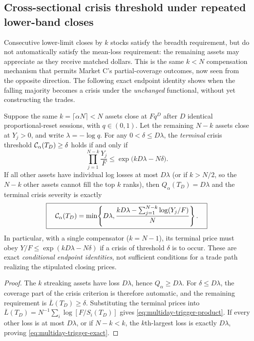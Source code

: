 \documentclass[review,hidelinks,onefignum,onetabnum]{siamonline250211}
\begin{document}
\subsection{Cross-sectional crisis threshold under repeated lower-band closes}\label{subsec:multiday-breadth}
Consecutive lower-limit closes by $k$ stocks satisfy the breadth requirement, but do not automatically satisfy the mean-loss requirement: the remaining assets may appreciate as they receive matched dollars. This is the same $k<N$ compensation mechanism that permits Market C's partial-coverage outcomes, now seen from the opposite direction. The following exact endpoint identity shows when the falling majority becomes a crisis under the \emph{unchanged} functional, without yet constructing the trades.
\begin{proposition}\label{prop:multiday-crisis-trigger}
Suppose the same $k=\lceil\alpha N\rceil<N$ assets close at $Fq^D$ after $D$ identical proportional-reset sessions, with $q\in(0,1)$. Let the remaining $N-k$ assets close at $Y_j>0$, and write $\lambda=-\log q$. For any $0<\delta\le D\lambda$, the \emph{terminal} crisis threshold $\mathcal{C}_\alpha(T_D)\ge\delta$ holds if and only if
\begin{equation}\label{eq:multiday-trigger-product}
\boxed{\qquad \prod_{j=1}^{N-k}\frac{Y_j}{F}
 \le\exp\bigl(kD\lambda-N\delta\bigr).\qquad}
\end{equation}
If all other assets have individual log losses at most $D\lambda$ (or if $k>N/2$, so the $N-k$ other assets cannot fill the top $k$ ranks), then $Q_\alpha(T_D)=D\lambda$ and the terminal crisis severity is exactly
\begin{equation}\label{eq:multiday-trigger-exact}
\boxed{\quad\mathcal{C}_\alpha(T_D)=\min\!\left\{D\lambda,
 \frac{kD\lambda-\sum_{j=1}^{N-k}\log(Y_j/F)}{N}\right\}.\quad}
\end{equation}
In particular, with a single compensator ($k=N-1$), its terminal price must obey $Y/F\le\exp(kD\lambda-N\delta)$ if a crisis of threshold $\delta$ is to occur. These are exact \emph{conditional endpoint identities}, not sufficient conditions for a trade path realizing the stipulated closing prices.
\end{proposition}
\begin{proof}
The $k$ streaking assets have loss $D\lambda$, hence $Q_\alpha\ge D\lambda$. For $\delta\le D\lambda$, the coverage part of the crisis criterion is therefore automatic, and the remaining requirement is $\overline L(T_D)\ge\delta$. Substituting the terminal prices into $\overline L(T_D)=N^{-1}\sum_i\log[F/S_i(T_D)]$ gives \eqref{eq:multiday-trigger-product}. If every other loss is at most $D\lambda$, or if $N-k<k$, the $k$th-largest loss is exactly $D\lambda$, proving \eqref{eq:multiday-trigger-exact}.
\end{proof}
\end{document}
